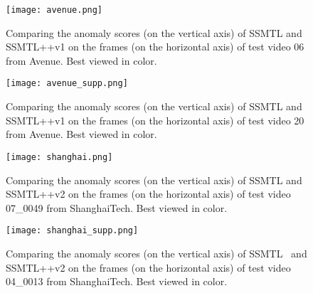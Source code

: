 \documentclass[times,twocolumn,final,authoryear]{elsarticle}
\begin{document}
\begin{figure}[t]
\begin{center}
\texttt{[image: avenue.png]}
\end{center}
\vspace{-0.4cm}
   \caption{Comparing the anomaly scores (on the vertical axis) of SSMTL \citep{Georgescu-CVPR-2021} and SSMTL++v1 on the frames (on the horizontal axis) of test video 06 from Avenue. Best viewed in color.}
\label{fig:avenue}
\end{figure}

\begin{figure}[t]
\begin{center}
\texttt{[image: avenue\_supp.png]}
\end{center}
\vspace{-0.4cm}
   \caption{Comparing the anomaly scores (on the vertical axis) of SSMTL \citep{Georgescu-CVPR-2021} and SSMTL++v1 on the frames (on the horizontal axis) of test video 20 from Avenue. Best viewed in color.}
\label{fig:avenue2}
\end{figure}

\begin{figure}[t]
\begin{center}
\texttt{[image: shanghai.png]}
\end{center}
\vspace{-0.4cm}
   \caption{Comparing the anomaly scores (on the vertical axis) of SSMTL \citep{Georgescu-CVPR-2021} and SSMTL++v2 on the frames (on the horizontal axis) of test video 07\_0049 from ShanghaiTech. Best viewed in color.}
\label{fig:shanghai}
\end{figure}

\begin{figure}[t]
\begin{center}
\texttt{[image: shanghai\_supp.png]}
\end{center}
\vspace{-0.4cm}
   \caption{Comparing the anomaly scores (on the vertical axis) of SSMTL~\citep{Georgescu-CVPR-2021} and SSMTL++v2 on the frames (on the horizontal axis) of test video 04\_0013 from ShanghaiTech. Best viewed in color.}
\label{fig:shanghai2}
\end{figure}
\end{document}
